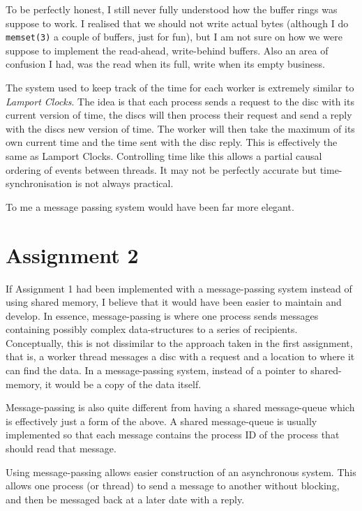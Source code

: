\documentclass[12pt]{article}
\begin{document}
To be perfectly honest, I still never fully understood how the buffer rings was suppose to work. I realised that we should not write actual bytes (although I do \texttt{memset(3)} a couple of buffers, just for fun), but I am not sure on how we were suppose to implement the read-ahead, write-behind buffers. Also an area of confusion I had, was the read when its full, write when its empty business.

The system used to keep track of the time for each worker is extremely similar to \emph{Lamport Clocks}. The idea is that each process sends a request to the disc with its current version of time, the discs will then process their request and send a reply with the discs new version of time. The worker will then take the maximum of its own current time and the time sent with the disc reply. This is effectively the same as Lamport Clocks. Controlling time like this allows a partial causal ordering of events between threads. It may not be perfectly accurate but time-synchronisation is not always practical.

To me a message passing system would have been far more elegant.

\section*{Assignment 2}

If Assignment 1 had been implemented with a message-passing system instead of using shared memory, I believe that it would have been easier to maintain and develop. In essence, message-passing is where one process sends messages containing possibly complex data-structures to a series of recipients. Conceptually, this is not dissimilar to the approach taken in the first assignment, that is, a worker thread messages a disc with a request and a location to where it can find the data. In a message-passing system, instead of a pointer to shared-memory, it would be a copy of the data itself.

Message-passing is also quite different from having a shared message-queue which is effectively just a form of the above. A shared message-queue is usually implemented so that each message contains the process ID of the process that should read that message.

Using message-passing allows easier construction of an asynchronous system. This allows one process (or thread) to send a message to another without blocking, and then be messaged back at a later date with a reply. 
\end{document}
